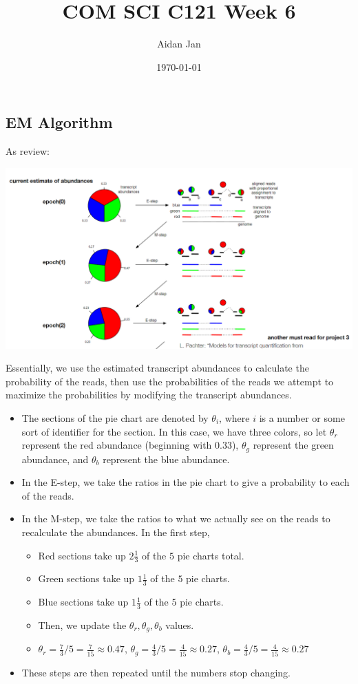 \documentclass[10pt]{article}
\title{COM SCI C121 Week 6}
\author{Aidan Jan}
\date{\today}
\begin{document}
\maketitle

\subsection*{EM Algorithm}
As review:
\begin{center}
    \includegraphics*[scale=0.4]{W5_6}
\end{center}
Essentially, we use the estimated transcript abundances to calculate the probability of the reads, then use the probabilities of the reads we attempt to maximize the probabilities by modifying the transcript abundances.
\begin{itemize}
    \item The sections of the pie chart are denoted by $\theta_i$, where $i$ is a number or some sort of identifier for the section.  In this case, we have three colors, so let $\theta_r$ represent the red abundance (beginning with 0.33), $\theta_g$ represent the green abundance, and $\theta_b$ represent the blue abundance.
    \item In the E-step, we take the ratios in the pie chart to give a probability to each of the reads. 
    \item In the M-step, we take the ratios to what we actually see on the reads to recalculate the abundances.  In the first step,
    \begin{itemize}
        \item Red sections take up $2\frac{1}{3}$ of the $5$ pie charts total.
        \item Green sections take up $1\frac{1}{3}$ of the $5$ pie charts.
        \item Blue sections take up $1\frac{1}{3}$ of the $5$ pie charts.
        \item Then, we update the $\theta_r, \theta_g, \theta_b$ values.
        \item $\theta_r = \frac{7}{3} / 5 = \frac{7}{15} \approx 0.47$, $\theta_g = \frac{4}{3} / 5 = \frac{4}{15} \approx 0.27$, $\theta_b = \frac{4}{3} / 5 = \frac{4}{15} \approx 0.27$
    \end{itemize}
    \item These steps are then repeated until the numbers stop changing.
\end{itemize}
\end{document}

